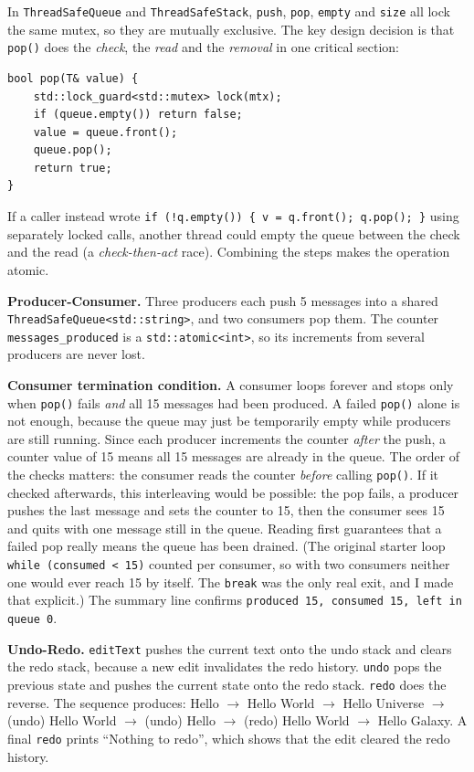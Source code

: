 \documentclass[11pt]{article}
\begin{document}
In \texttt{ThreadSafeQueue} and \texttt{ThreadSafeStack}, \texttt{push},
\texttt{pop}, \texttt{empty} and \texttt{size} all lock the same mutex, so they
are mutually exclusive. The key design decision is that \texttt{pop()} does the
\emph{check}, the \emph{read} and the \emph{removal} in one critical section:
\begin{lstlisting}
bool pop(T& value) {
    std::lock_guard<std::mutex> lock(mtx);
    if (queue.empty()) return false;
    value = queue.front();
    queue.pop();
    return true;
}
\end{lstlisting}
If a caller instead wrote \texttt{if (!q.empty()) \{ v = q.front(); q.pop(); \}}
using separately locked calls, another thread could empty the queue between
the check and the read (a \emph{check-then-act} race). Combining the steps
makes the operation atomic.

\textbf{Producer-Consumer.} Three producers each push 5 messages into a shared
\texttt{ThreadSafeQueue<std::string>}, and two consumers pop them. The
counter \texttt{messages\_produced} is a \texttt{std::atomic<int>}, so its
increments from several producers are never lost.

\textbf{Consumer termination condition.} A consumer loops forever and stops
only when \texttt{pop()} fails \emph{and} all 15 messages had been produced. A
failed \texttt{pop()} alone is not enough, because the queue may just be
temporarily empty while producers are still running. Since each producer
increments the counter \emph{after} the push, a counter value of 15 means all
15 messages are already in the queue. The order of the checks matters: the
consumer reads the counter \emph{before} calling \texttt{pop()}. If it checked
afterwards, this interleaving would be possible: the pop fails, a producer pushes
the last message and sets the counter to 15, then the consumer sees 15 and quits
with one message still in the queue. Reading first guarantees that a failed pop
really means the queue has been drained. (The original starter
loop \texttt{while (consumed < 15)} counted per consumer, so with two consumers
neither one would ever reach 15 by itself. The \texttt{break} was the only real
exit, and I made that explicit.) The summary line confirms
\texttt{produced 15, consumed 15, left in queue 0}.

\textbf{Undo-Redo.} \texttt{editText} pushes the current text onto the undo
stack and clears the redo stack, because a new edit invalidates the redo
history. \texttt{undo} pops the previous state and pushes the current state onto
the redo stack. \texttt{redo} does the reverse. The sequence produces:
Hello $\rightarrow$ Hello World $\rightarrow$ Hello Universe $\rightarrow$
(undo) Hello World $\rightarrow$ (undo) Hello $\rightarrow$ (redo) Hello World
$\rightarrow$ Hello Galaxy. A final \texttt{redo} prints ``Nothing to redo'',
which shows that the edit cleared the redo history.
\end{document}
